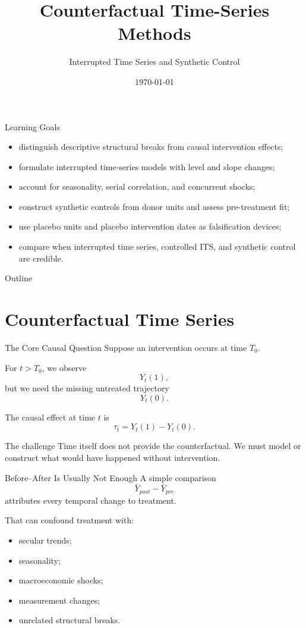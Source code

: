 \documentclass[aspectratio=169,11pt]{beamer}
\title[Counterfactual Time Series]{Counterfactual Time-Series Methods}
\subtitle{Interrupted Time Series and Synthetic Control}
\date{\today}
\begin{document}
\begin{frame}
\titlepage
\end{frame}

\begin{frame}{Learning Goals}
\begin{itemize}
\item distinguish descriptive structural breaks from causal intervention effects;
\item formulate interrupted time-series models with level and slope changes;
\item account for seasonality, serial correlation, and concurrent shocks;
\item construct synthetic controls from donor units and assess pre-treatment fit;
\item use placebo units and placebo intervention dates as falsification devices;
\item compare when interrupted time series, controlled ITS, and synthetic control are credible.
\end{itemize}
\end{frame}

\begin{frame}{Outline}
\tableofcontents
\end{frame}

\section{Counterfactual Time Series}

\begin{frame}{The Core Causal Question}
Suppose an intervention occurs at time \(T_0\).

For \(t>T_0\), we observe
\[
Y_t(1),
\]
but we need the missing untreated trajectory
\[
Y_t(0).
\]

The causal effect at time \(t\) is
\[
\tau_t=Y_t(1)-Y_t(0).
\]

\begin{alertblock}{The challenge}
Time itself does not provide the counterfactual. We must model or construct what would have happened without intervention.
\end{alertblock}
\end{frame}

\begin{frame}{Before--After Is Usually Not Enough}
A simple comparison
\[
\bar Y_{post}-\bar Y_{pre}
\]
attributes every temporal change to treatment.

That can confound treatment with:
\begin{itemize}
\item secular trends;
\item seasonality;
\item macroeconomic shocks;
\item measurement changes;
\item unrelated structural breaks.
\end{itemize}
\end{frame}
\end{document}
